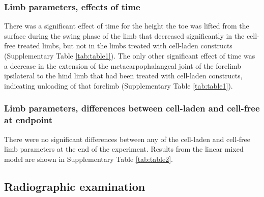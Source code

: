 \documentclass[twocolumn, empirical, authordate, issue]{jote-new-article}
\begin{document}
\subsubsection{Limb parameters, effects of time} 

There was a significant effect of time for the height the toe was lifted from the surface during the swing phase of the limb that decreased significantly in the cell-free treated limbs, but not in the limbs treated with cell-laden constructs (Supplementary Table \ref{tab:table1}). The only other significant effect of time was a decrease in the extension of the metacarpophalangeal joint of the forelimb ipsilateral to the hind limb that had been treated with cell-laden constructs, indicating unloading of that forelimb (Supplementary Table \ref{tab:table1}).

\subsubsection{Limb parameters, differences between cell-laden and cell-free at endpoint} 

There were no significant differences between any of the cell-laden and cell-free limb parameters at the end of the experiment. Results from the linear mixed model are shown in Supplementary Table \ref{tab:table2}.


\subsection{Radiographic examination} 
\end{document}
